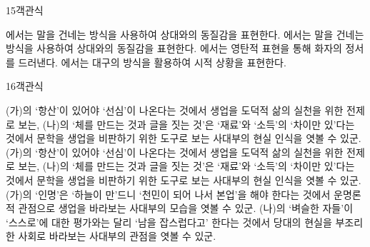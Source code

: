\documentclass[fs85,seriesWit]{korfarm-base}
\begin{document}
\begin{kfQBlock}{15}{객관식}
\begin{kfChoices}
에서는 말을 건네는 방식을 사용하여 상대와의 동질감을 표현한다.
에서는 말을 건네는 방식을 사용하여 상대와의 동질감을 표현한다.
에서는 영탄적 표현을 통해 화자의 정서를 드러낸다.
에서는 대구의 방식을 활용하여 시적 상황을 표현한다.
\end{kfChoices}
\end{kfQBlock}

\begin{kfQBlock}{16}{객관식}
\begin{kfChoices}
\kfChoice (가)의 ‘항산’이 있어야 ‘선심’이 나온다는 것에서 생업을 도덕적 삶의 실천을 위한 전제로 보는, (나)의 ‘체를 만드는 것과 글을 짓는 것’은 ‘재료’와 ‘소득’의 ‘차이만 있’다는 것에서 문학을 생업을 비판하기 위한 도구로 보는 사대부의 현실 인식을 엿볼 수 있군.
\kfChoice (가)의 ‘항산’이 있어야 ‘선심’이 나온다는 것에서 생업을 도덕적 삶의 실천을 위한 전제로 보는, (나)의 ‘체를 만드는 것과 글을 짓는 것’은 ‘재료’와 ‘소득’의 ‘차이만 있’다는 것에서 문학을 생업을 비판하기 위한 도구로 보는 사대부의 현실 인식을 엿볼 수 있군.
\kfChoice (가)의 ‘인명’은 ‘하늘이 만’드니 ‘천민이 되어 나서 본업’을 해야 한다는 것에서 운명론적 관점으로 생업을 바라보는 사대부의 모습을 엿볼 수 있군.
\kfChoice (나)의 ‘벼슬한 자들’이 ‘스스로’에 대한 평가와는 달리 ‘남을 잡스럽다고’ 한다는 것에서 당대의 현실을 부조리한 사회로 바라보는 사대부의 관점을 엿볼 수 있군.
\end{kfChoices}
\end{kfQBlock}
\end{document}
